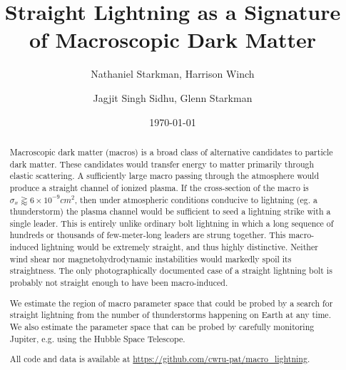\documentclass[%
reprint,
 amsmath,amssymb,
 aps,
 prd,
]{revtex4-2}
\begin{document}

\title{Straight Lightning as a Signature of Macroscopic Dark Matter}

\author{Nathaniel Starkman, Harrison Winch}%
%

\author{Jagjit Singh Sidhu, Glenn Starkman}

\date{\today}


\begin{abstract}

    Macroscopic dark matter (macros) is a broad class of alternative candidates to particle dark matter. These candidates would transfer energy to matter primarily through  elastic scattering. A sufficiently large macro passing through the atmosphere would produce a straight channel of ionized plasma. If the cross-section of the macro is $\sigma_x \gtrapprox 6 \times 10^{-9} cm^2$, then under atmospheric conditions conducive to lightning (eg. a thunderstorm) the plasma channel would be sufficient to seed a lightning strike with a single leader. This is entirely unlike ordinary bolt lightning in which a long sequence of hundreds or thousands of few-meter-long leaders are strung together. This macro-induced lightning would be extremely straight, and thus highly distinctive. Neither wind shear nor magnetohydrodynamic instabilities would markedly spoil its straightness. The only photographically documented case of a straight lightning bolt is probably not straight enough to have been macro-induced.

    We estimate the region of macro parameter space that could be probed by a search for straight lightning from the number of thunderstorms happening on Earth at any time. We also estimate the parameter space that can be probed by carefully monitoring Jupiter, e.g. using the Hubble Space Telescope.

    All code and data is available at \url{https://github.com/cwru-pat/macro_lightning}.

\end{abstract}
\end{document}
